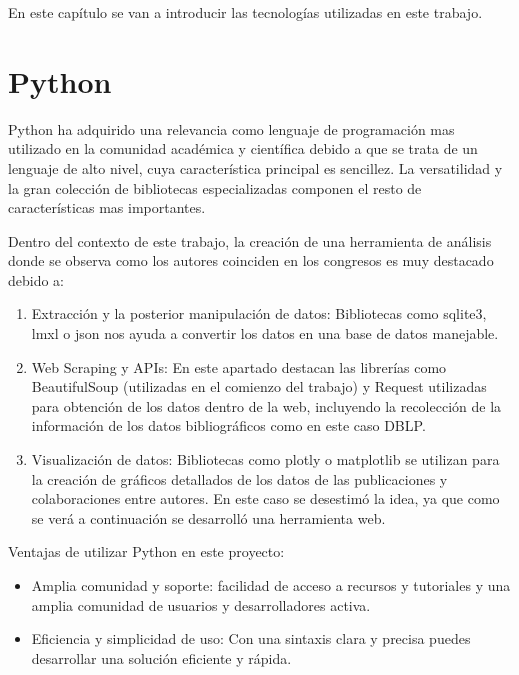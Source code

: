 \documentclass[a4paper, 12pt]{book}
\begin{document}
        En este capítulo se van a introducir las tecnologías utilizadas en este trabajo.

\section{Python} 
\label{sec:seccion1}

Python ha adquirido una relevancia como lenguaje de programación mas utilizado en la comunidad académica y científica debido a que se trata de un lenguaje de alto nivel, cuya característica principal es sencillez. La versatilidad y la gran colección de bibliotecas especializadas componen el resto de características mas importantes.

Dentro del contexto de este trabajo, la creación de una herramienta de análisis donde se observa como los autores coinciden en los congresos es muy destacado debido a:

\begin{enumerate}
    \item Extracción y la posterior manipulación de datos: Bibliotecas como sqlite3, lmxl o json nos ayuda a convertir los datos en una base de datos manejable.
    
    \item Web Scraping y APIs: En este apartado destacan las librerías como BeautifulSoup (utilizadas en el comienzo del trabajo) y Request utilizadas para obtención de los datos dentro de la web, incluyendo la recolección de la información de los datos bibliográficos como en este caso DBLP.

    \item Visualización de datos: Bibliotecas como plotly o matplotlib se utilizan para la creación de gráficos detallados de los datos de las publicaciones y colaboraciones entre autores. En este caso se desestimó la idea, ya que como se verá a continuación se desarrolló una herramienta web.
\end{enumerate}

Ventajas de utilizar Python en este proyecto:

\begin{itemize}
    \item Amplia comunidad y soporte: facilidad de acceso a recursos y tutoriales y una amplia comunidad de usuarios y desarrolladores activa.

    \item Eficiencia y simplicidad de uso: Con una sintaxis clara y precisa puedes desarrollar una solución eficiente y rápida.
\end{itemize}
\end{document}
